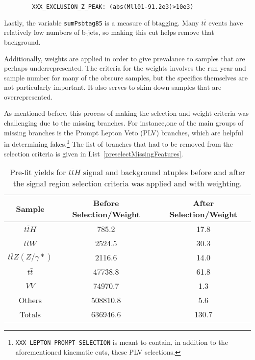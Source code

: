     \begin{verbatim}
        XXX_EXCLUSION_Z_PEAK: (abs(Mll01-91.2e3)>10e3)
    \end{verbatim}

    Lastly, the variable \texttt{sumPsbtag85} is a measure of btagging. Many $t\bar{t}$ events have relatively low numbers of b-jets, so making this cut helps remove that background.


    Additionally, weights are applied in order to give prevalance to samples that are perhaps underrepresented. The criteria for the weights involves the run year and sample number for many of the obscure samples, but the specifics themselves are not particularly important. It also serves to skim down samples that are overrepresented.

    As mentioned before, this process of making the selection and weight criteria was challenging due to the missing branches. For instance,one of the main groups of missing branches is the Prompt Lepton Veto (PLV) branches, which are helpful in determining fakes.\footnote{\texttt{XXX_LEPTON_PROMPT_SELECTION} is meant to contain, in addition to the aforementioned kinematic cuts, these PLV selections.} The list of branches that had to be removed from the selection criteria is given in List~\ref{preselectMissingFeatures}.

    \begin{table}[ht!]
        \centering
        \begin{tabular}{|c|c|c|}
            \hline
            Sample & Before Selection/Weight & After Selection/Weight \\ \hline
            $t\bar{t}H$ & 785.2 & 17.8 \\ \hline
            $t\bar{t}W$ & 2524.5 & 30.3 \\ \hline
            $t\bar{t}Z(Z/\gamma*)$ & 2116.6 & 14.0 \\ \hline
            $t\bar{t}$ & 47738.8 & 61.8 \\ \hline
            $VV$ & 74970.7 & 1.3 \\ \hline
            Others & 508810.8 & 5.6 \\ \hline\hline
            Totals & 636946.6 & 130.7 \\ \hline
        \end{tabular}
        \caption{Pre-fit yields for $t\bar{t}H$ signal and background ntuples before and after the signal region selection criteria was applied and with weighting.}
        \label{tthPreFitYields}
    \end{table}

